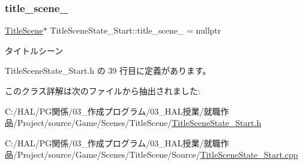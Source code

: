 \subsubsection{\texorpdfstring{title\+\_\+scene\+\_\+}{title\_scene\_}}
{\footnotesize\ttfamily \mbox{\hyperlink{class_title_scene}{Title\+Scene}}$\ast$ Title\+Scene\+State\+\_\+\+Start\+::title\+\_\+scene\+\_\+ = nullptr\hspace{0.3cm}{\ttfamily [private]}}



タイトルシーン 



 Title\+Scene\+State\+\_\+\+Start.\+h の 39 行目に定義があります。



このクラス詳解は次のファイルから抽出されました\+:\begin{DoxyCompactItemize}
\item 
C\+:/\+H\+A\+L/\+P\+G関係/03\+\_\+作成プログラム/03\+\_\+\+H\+A\+L授業/就職作品/\+Project/source/\+Game/\+Scenes/\+Title\+Scene/\mbox{\hyperlink{_title_scene_state___start_8h}{Title\+Scene\+State\+\_\+\+Start.\+h}}\item 
C\+:/\+H\+A\+L/\+P\+G関係/03\+\_\+作成プログラム/03\+\_\+\+H\+A\+L授業/就職作品/\+Project/source/\+Game/\+Scenes/\+Title\+Scene/\+Source/\mbox{\hyperlink{_title_scene_state___start_8cpp}{Title\+Scene\+State\+\_\+\+Start.\+cpp}}\end{DoxyCompactItemize}
